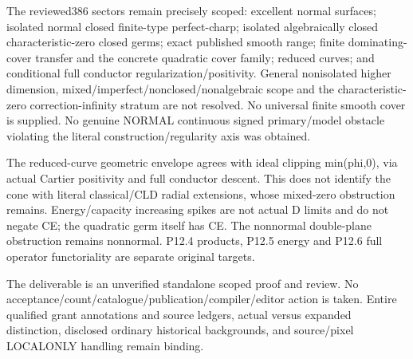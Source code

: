 \documentclass[11pt]{article}
\begin{document}
\begin{QualifiedData}
The reviewed386 sectors remain precisely scoped: excellent normal surfaces; isolated normal closed finite-type perfect-charp; isolated algebraically closed characteristic-zero closed germs; exact published smooth range; finite dominating-cover transfer and the concrete quadratic cover family; reduced curves; and conditional full conductor regularization/positivity. General nonisolated higher dimension, mixed/imperfect/nonclosed/nonalgebraic scope and the characteristic-zero correction-infinity stratum are not resolved. No universal finite smooth cover is supplied. No genuine NORMAL continuous signed primary/model obstacle violating the literal construction/regularity axis was obtained.

The reduced-curve geometric envelope agrees with ideal clipping min(phi,0), via actual Cartier positivity and full conductor descent. This does not identify the cone with literal classical/CLD radial extensions, whose mixed-zero obstruction remains. Energy/capacity increasing spikes are not actual D limits and do not negate CE; the quadratic germ itself has CE. The nonnormal double-plane obstruction remains nonnormal. P12.4 products, P12.5 energy and P12.6 full operator functoriality are separate original targets.

The deliverable is an unverified standalone scoped proof and review. No acceptance/count/catalogue/publication/compiler/editor action is taken. Entire qualified grant annotations and source ledgers, actual versus expanded distinction, disclosed ordinary historical backgrounds, and source/pixel LOCALONLY handling remain binding.
\end{QualifiedData}
\end{document}
